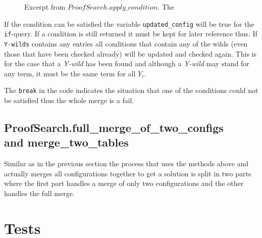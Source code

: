 \begin{figure}[H]
	\vspace{-10pt}
	
	\vspace{-10pt}
	\caption{Excerpt from $ProofSearch.apply\_condition$. The  }
	\vspace{-10pt}
\end{figure}


If the condition can be satisfied the variable \texttt{updated\_config} will be true for the \texttt{if}-query. If a condition is still returned it must be kept for later reference thus. If \texttt{Y-wilds} contains any entries all conditions that contain any of the wilds (even those that have been checked already) will be updated and checked again. This is for the case that a \emph{Y-wild} has been found and although a \emph{Y-wild} may stand for any term, it must be the same term for all $Y_i$. 

The \texttt{break} in the code indicates the situation that one of the conditions could not be satisfied thus the whole merge is a fail. 

\subsection[ProofSearch.merge]{ProofSearch.full\_merge\_of\_two\_configs \\and merge\_two\_tables}
Similar as in the previous section the process that uses the methods above and actually merges all configurations together to get a solution is split in two parts where the first part handles a merge of only two configurations and the other handles the full merge.



\section{Tests}

